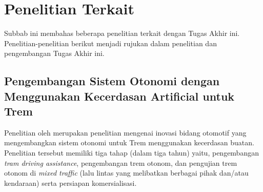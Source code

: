 \section{Penelitian Terkait}
Subbab ini membahas beberapa penelitian terkait dengan Tugas Akhir ini.
Penelitian-penelitian berikut menjadi rujukan dalam penelitian dan pengembangan
Tugas Akhir ini.

\subsection{Pengembangan Sistem Otonomi dengan Menggunakan Kecerdasan Artificial untuk Trem}

Penelitian oleh \cite{rispro-trilaksono} merupakan penelitian mengenai inovasi
bidang otomotif yang mengembangkan sistem otonomi untuk Trem menggunakan
kecerdasan buatan. Penelitian tersebut memiliki tiga tahap (dalam tiga tahun)
yaitu, pengembangan \textit{tram driving assistance}, pengembangan trem otonom,
dan pengujian trem otonom di \textit{mixed traffic} (lalu lintas yang melibatkan
berbagai pihak dan/atau kendaraan) serta persiapan komersialisasi.

